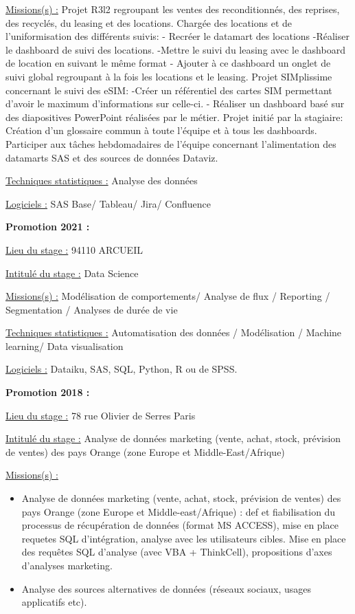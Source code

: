 \documentclass[
  letterpaper,
  DIV=11,
  numbers=noendperiod]{scrreprt}
\begin{document}
\uline{Missions(s) :} Projet R3l2 regroupant les ventes des
reconditionnés, des reprises, des recyclés, du leasing et des locations.
Chargée des locations et de l'uniformisation des différents suivis: -
Recréer le datamart des locations -Réaliser le dashboard de suivi des
locations. -Mettre le suivi du leasing avec le dashboard de location en
suivant le même format - Ajouter à ce dashboard un onglet de suivi
global regroupant à la fois les locations et le leasing. Projet
SIMplissime concernant le suivi des eSIM: -Créer un référentiel des
cartes SIM permettant d'avoir le maximum d'informations sur celle-ci. -
Réaliser un dashboard basé sur des diapositives PowerPoint réalisées par
le métier. Projet initié par la stagiaire: Création d'un glossaire
commun à toute l'équipe et à tous les dashboards. Participer aux tâches
hebdomadaires de l'équipe concernant l'alimentation des datamarts SAS et
des sources de données Dataviz.

\uline{Techniques statistiques :} Analyse des données

\uline{Logiciels :} SAS Base/ Tableau/ Jira/ Confluence

\textbf{Promotion 2021 :}

\uline{Lieu du stage :} 94110 ARCUEIL

\uline{Intitulé du stage :} Data Science

\uline{Missions(s) :} Modélisation de comportements/ Analyse de flux /
Reporting / Segmentation / Analyses de durée de vie

\uline{Techniques statistiques :} Automatisation des données /
Modélisation / Machine learning/ Data visualisation

\uline{Logiciels :} Dataiku, SAS, SQL, Python, R ou de SPSS.

\textbf{Promotion 2018 :}

\uline{Lieu du stage :} 78 rue Olivier de Serres Paris

\uline{Intitulé du stage :} Analyse de données marketing (vente, achat,
stock, prévision de ventes) des pays Orange (zone Europe et
Middle-East/Afrique)

\uline{Missions(s) :}

\begin{itemize}
\item
  Analyse de données marketing (vente, achat, stock, prévision de
  ventes) des pays Orange (zone Europe et Middle-east/Afrique) : def et
  fiabilisation du processus de récupération de données (format MS
  ACCESS), mise en place requetes SQL d'intégration, analyse avec les
  utilisateurs cibles. Mise en place des requêtes SQL d'analyse (avec
  VBA + ThinkCell), propositions d'axes d'analyses marketing.
\item
  Analyse des sources alternatives de données (réseaux sociaux, usages
  applicatifs etc).
\end{itemize}
\end{document}
